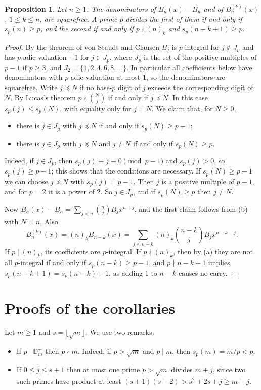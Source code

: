 \documentclass[11pt]{amsart}
\newtheorem{proposition}[theorem]{Proposition}
\theoremstyle{remark}
\numberwithin{equation}{section}
\newcommand{\Dp}{\mathbb D^{+}}
\newcommand{\fl}[1]{\lfloor #1\rfloor}
\begin{document}
\begin{proposition}\label{prop:den}
Let $n\ge1$. The denominators of $B_n(x)-B_n$ and of $B_n^{(k)}(x)$, $1\le k\le n$, are squarefree. A prime $p$ divides the first of
them if and only if $s_p(n)\ge p$, and the second if and only if $p\nmid(n)_k$ and $s_p(n-k+1)\ge p$.
\end{proposition}
\begin{proof}
By the theorem of von Staudt and Clausen $B_j$ is $p$-integral for $j\notin J_p$ and has $p$-adic valuation $-1$ for $j\in J_p$,
where $J_p$ is the set of the positive multiples of $p-1$ if $p\ge3$, and $J_2=\{1,2,4,6,8,\dots\}$. In particular all
coefficients below have denominators with $p$-adic valuation at most $1$, so the denominators are squarefree.
Write $j\preceq N$ if no base-$p$ digit of $j$ exceeds the corresponding digit of $N$. By Lucas's theorem $p\nmid\binom Nj$ if and only
if $j\preceq N$. In this case $s_p(j)\le s_p(N)$, with equality only for $j=N$. We claim that, for $N\ge0$,
\begin{itemize}
\item[(a)] there is $j\in J_p$ with $j\preceq N$ if and only if $s_p(N)\ge p-1$;
\item[(b)] there is $j\in J_p$ with $j\preceq N$ and $j\ne N$ if and only if $s_p(N)\ge p$.
\end{itemize}
Indeed, if $j\in J_p$, then $s_p(j)\equiv j\equiv0\pmod{p-1}$ and $s_p(j)>0$, so $s_p(j)\ge p-1$; this shows that the conditions are
necessary. If $s_p(N)\ge p-1$ we can choose $j\preceq N$ with $s_p(j)=p-1$. Then $j$ is a positive multiple of $p-1$, and for $p=2$ it is
a power of $2$. So $j\in J_p$, and if $s_p(N)\ge p$ then $j\ne N$.

Now $B_n(x)-B_n=\sum_{j<n}\binom njB_jx^{n-j}$, and the first claim follows from (b) with $N=n$. Also
\[
B_n^{(k)}(x)=(n)_kB_{n-k}(x)=\sum_{j\le n-k}(n)_k\binom{n-k}jB_jx^{n-k-j}.
\]
If $p\mid(n)_k$, its coefficients are $p$-integral. If $p\nmid(n)_k$, then by (a) they are not all $p$-integral if and only if
$s_p(n-k)\ge p-1$, and $p\nmid n-k+1$ implies $s_p(n-k+1)=s_p(n-k)+1$, as adding $1$ to $n-k$ causes no carry.
\end{proof}

\section{Proofs of the corollaries}

Let $m\ge1$ and $s=\fl{\sqrt m}$. We use two remarks.
\begin{itemize}
\item[(A)] If $p\mid\Dp_m$ then $p\nmid m$. Indeed, if $p>\sqrt m$ and $p\mid m$, then $s_p(m)=m/p<p$.
\item[(B)] If $0\le j\le s+1$ then at most one prime $p>\sqrt m$ divides $m+j$, since two such primes have product at least
$(s+1)(s+2)>s^2+2s+j\ge m+j$.
\end{itemize}
\end{document}
